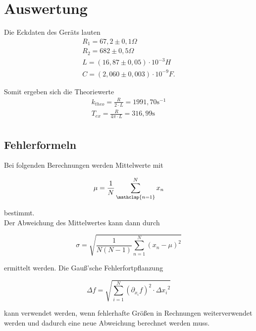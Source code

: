 \section{Auswertung}
\label{sec:Auswertung}

Die Eckdaten des Geräts lauten 
\begin{align*}
  R_1 = 67,2 \pm 0,1 \Omega \\
  R_2 = 682 \pm 0,5 \Omega \\
  L = (16,87 \pm 0,05) \cdot 10^{-3}H \\
  C = (2,060 \pm 0,003) \cdot 10^{-9}F.   %
\end{align*}


Somit ergeben sich die Theoriewerte 
\begin{align*}
  k_{theo} = \frac{R}{2 \cdot L} = 1991,70 \mathrm{s^{-1}} \\
  T_{ex} = \frac{R}{4 \pi \cdot L} = 316,99 \mathrm{s} \\  %
\end{align*}


\subsection{Fehlerformeln}
\label{subsec:fehler}

Bei folgenden Berechnungen werden Mittelwerte mit
\begin{center}
  \begin{equation}
    \mu = \dfrac{1}{N}\sum\limits_{\mathclap{n=1}}^{N}x_n
  \end{equation}
\end{center}

bestimmt. \\
Der Abweichung des Mittelwertes kann dann durch
\begin{center}
  \begin{equation}
    \sigma=\sqrt{\dfrac{1}{N(N-1)}\sum\limits_{n=1}^{N} (x_n - \mu)^2}
  \end{equation}
\end{center}
ermittelt werden. 
Die Gauß'sche Fehlerfortpflanzung
\begin{center}
  \begin{equation}
    \Delta f = \sqrt{\sum_{i=1}^{N}\left(\partial_{x_i}f\right)^2\cdot{\Delta x_i}^2}
  \end{equation}
\end{center}
kann verwendet werden, wenn fehlerhafte Größen in Rechnungen weiterverwendet werden und dadurch eine neue Abweichung
berechnet werden muss.




